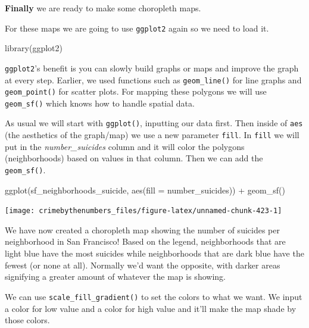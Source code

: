 \documentclass[
]{krantz}
\makeatletter
\newenvironment{Shaded}{\begin{snugshade}}{\end{snugshade}}
\newcommand{\AttributeTok}[1]{\textcolor[rgb]{0.61,0.61,0.61}{#1}}
\newcommand{\FunctionTok}[1]{\textcolor[rgb]{0,0,0}{#1}}
\newcommand{\NormalTok}[1]{#1}
\newcommand{\SpecialCharTok}[1]{\textcolor[rgb]{0,0,0}{#1}}
\newenvironment{kframe}{%
\medskip{}
\setlength{\fboxsep}{.8em}
 \def\at@end@of@kframe{}%
 \ifinner\ifhmode%
  \def\at@end@of@kframe{\end{minipage}}%
  \begin{minipage}{\columnwidth}%
 \fi\fi%
 \def\FrameCommand##1{\hskip\@totalleftmargin \hskip-\fboxsep
 \colorbox{shadecolor}{##1}\hskip-\fboxsep
     \hskip-\linewidth \hskip-\@totalleftmargin \hskip\columnwidth}%
 \MakeFramed {\advance\hsize-\width
   \@totalleftmargin\z@ \linewidth\hsize
   \@setminipage}}%
 {\par\unskip\endMakeFramed%
 \at@end@of@kframe}
\renewenvironment{Shaded}{\begin{kframe}}{\end{kframe}}
\makeatother
\begin{document}
\textbf{Finally} we are ready to make some choropleth maps.

For these maps we are going to use \texttt{ggplot2} again so
we need to load it.

\begin{Shaded}
\begin{Highlighting}[]
\FunctionTok{library}\NormalTok{(ggplot2)}
\end{Highlighting}
\end{Shaded}

\texttt{ggplot2}'s benefit is you can slowly build graphs or
maps and improve the graph at every step. Earlier, we used
functions such as \texttt{geom\_line()} for line graphs and
\texttt{geom\_point()} for scatter plots. For mapping these
polygons we will use \texttt{geom\_sf()} which knows how to
handle spatial data.

As usual we will start with \texttt{ggplot()}, inputting our
data first. Then inside of \texttt{aes} (the aesthetics of
the graph/map) we use a new parameter \texttt{fill}. In
\texttt{fill} we will put in the \emph{number\_suicides}
column and it will color the polygons (neighborhoods) based
on values in that column. Then we can add the
\texttt{geom\_sf()}.

\begin{Shaded}
\begin{Highlighting}[]
\FunctionTok{ggplot}\NormalTok{(sf\_neighborhoods\_suicide, }\FunctionTok{aes}\NormalTok{(}\AttributeTok{fill =}\NormalTok{ number\_suicides)) }\SpecialCharTok{+}
  \FunctionTok{geom\_sf}\NormalTok{()}
\end{Highlighting}
\end{Shaded}

\begin{center}\texttt{[image: crimebythenumbers\_files/figure-latex/unnamed-chunk-423-1]} \end{center}

We have now created a choropleth map showing the number of
suicides per neighborhood in San Francisco! Based on the
legend, neighborhoods that are light blue have the most
suicides while neighborhoods that are dark blue have the
fewest (or none at all). Normally we'd want the opposite,
with darker areas signifying a greater amount of whatever
the map is showing.

We can use \texttt{scale\_fill\_gradient()} to set the
colors to what we want. We input a color for low value and a
color for high value and it'll make the map shade by those
colors.
\end{document}
